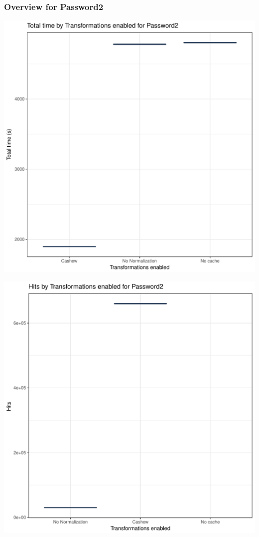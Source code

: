\documentclass{article}\usepackage[]{graphicx}\usepackage[]{color}
\makeatletter
\def\maxwidth{ %
  \ifdim\Gin@nat@width>\linewidth
    \linewidth
  \else
    \Gin@nat@width
  \fi
}
\newenvironment{knitrout}{}{} %
\makeatother
\begin{document}
\subsubsection{Overview for Password2}
\begin{knitrout}
\color{fgcolor}
\includegraphics[width=\maxwidth]{figure/password2-1} 

\includegraphics[width=\maxwidth]{figure/password2-2} 


\end{knitrout}
\end{document}
